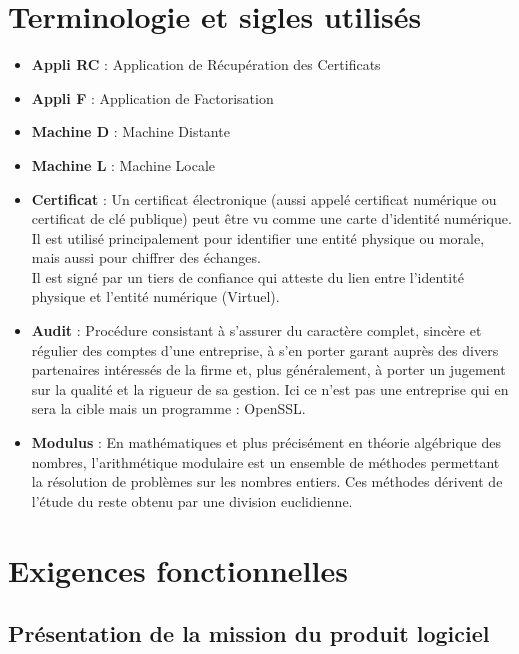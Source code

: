 \documentclass[a4paper,11pt,french]{article}
\begin{document}
\section{Terminologie et sigles utilisés}
\begin{itemize}
	\item \textbf{Appli RC} : Application de Récupération des Certificats
	\item \textbf{Appli F} : Application de Factorisation
	\item \textbf{Machine D} : Machine Distante
	\item \textbf{Machine L} : Machine Locale
	\item \textbf{Certificat} : Un certificat électronique (aussi appelé certificat numérique ou certificat de clé publique) peut être vu comme une carte d'identité numérique. Il est utilisé principalement pour identifier une entité physique ou morale, mais aussi pour chiffrer des échanges. \\Il est signé par un tiers de confiance qui atteste du lien entre l'identité physique et l'entité numérique (Virtuel).
	\item \textbf{Audit} : Procédure consistant à s'assurer du caractère complet, sincère et régulier des comptes d'une entreprise, à s'en porter garant auprès des divers partenaires intéressés de la firme et, plus généralement, à porter un jugement sur la qualité et la rigueur de sa gestion. Ici ce n'est pas une entreprise qui en sera la cible mais un programme : OpenSSL.
	\item \textbf{Modulus} : En mathématiques et plus précisément en théorie algébrique des nombres, l’arithmétique modulaire est un ensemble de méthodes permettant la résolution de problèmes sur les nombres entiers. Ces méthodes dérivent de l’étude du reste obtenu par une division euclidienne.
\end{itemize}

\section{Exigences fonctionnelles}
\subsection{Présentation de la mission du produit logiciel}
\end{document}
